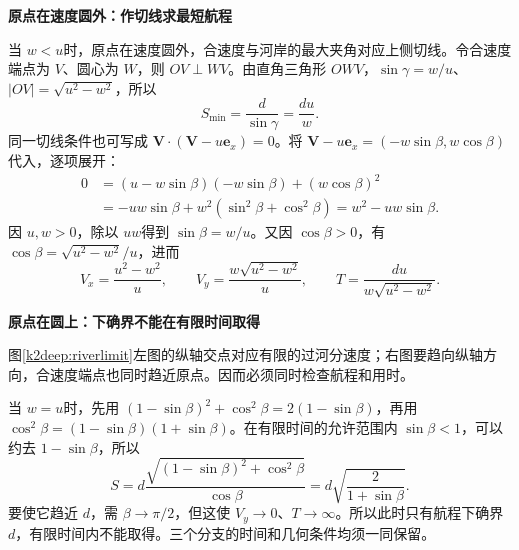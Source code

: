 \begin{solution}
\par\medskip{}\noindent\textbf{原点在速度圆外：作切线求最短航程}\par\nobreak
当 $w<u$时，原点在速度圆外，合速度与河岸的最大夹角对应上侧切线。令合速度端点为 $V$、圆心为 $W$，则 $OV\perp WV$。由直角三角形 $OWV$，$\sin\gamma=w/u$、$|OV|=\sqrt{u^2-w^2}$，所以
\[\boxed{S_{\min}=\frac d{\sin\gamma}=\frac{du}{w}}.\]
同一切线条件也可写成 $\bm V\cdot(\bm V-u\bm e_x)=0$。将 $\bm V-u\bm e_x=(-w\sin\beta,w\cos\beta)$代入，逐项展开：
\begin{align*}
 0&=(u-w\sin\beta)(-w\sin\beta)+(w\cos\beta)^2\\
  &=-uw\sin\beta+w^2(\sin^2\beta+\cos^2\beta)
   =w^2-uw\sin\beta.
\end{align*}
因 $u,w>0$，除以 $uw$得到 $\sin\beta=w/u$。又因 $\cos\beta>0$，有 $\cos\beta=\sqrt{u^2-w^2}/u$，进而
\[V_x=\frac{u^2-w^2}{u},\qquad
V_y=\frac{w\sqrt{u^2-w^2}}u,\qquad
T=\frac{du}{w\sqrt{u^2-w^2}}.\]



\par\medskip{}\noindent\textbf{原点在圆上：下确界不能在有限时间取得}\par\nobreak
{}
图\ref{k2deep:riverlimit}左图的纵轴交点对应有限的过河分速度；右图要趋向纵轴方向，合速度端点也同时趋近原点。因而必须同时检查航程和用时。

当 $w=u$时，先用 $(1-\sin\beta)^2+\cos^2\beta=2(1-\sin\beta)$，再用 $\cos^2\beta=(1-\sin\beta)(1+\sin\beta)$。在有限时间的允许范围内 $\sin\beta<1$，可以约去 $1-\sin\beta$，所以
\[S=d\frac{\sqrt{(1-\sin\beta)^2+\cos^2\beta}}{\cos\beta}
   =d\sqrt{\frac{2}{1+\sin\beta}}.\]
要使它趋近 $d$，需 $\beta\to\pi/2$，但这使 $V_y\to0$、$T\to\infty$。所以此时只有航程下确界 $d$，有限时间内不能取得。三个分支的时间和几何条件均须一同保留。\end{solution}

